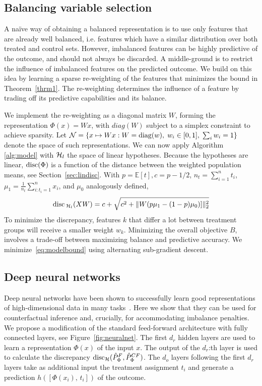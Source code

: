\subsection{Balancing variable selection} \label{sec:varsel}
A na\"{i}ve way of obtaining a balanced representation is to use only features that are already well balanced, i.e. features which have a similar distribution over both treated and control sets. However, imbalanced features can be highly predictive of the outcome, and should not always be discarded. A middle-ground is to restrict the influence of imbalanced features on the predicted outcome. We build on this idea by learning a sparse re-weighting of the features that minimizes the bound in Theorem~\ref{thrm1}. The re-weighting determines the influence of a feature by trading off its predictive capabilities and its balance.

We implement the re-weighting as a diagonal matrix $W$, forming the representation $\Phi(x) = Wx$, with $diag(W)$ subject to a simplex constraint to achieve sparsity. Let $\mathcal{N} = \{x \mapsto Wx : W = \mbox{diag}(w), \; w_i \in [0,1], \; \sum_i w_i = 1\} $ denote the space of such representations. We can now apply Algorithm \ref{alg:model} with $\mathcal{H}_l$ the space of linear hypotheses.
Because the hypotheses are linear, $\operatorname*{disc}(\Phi)$ is a function of the distance between the weighted population means, see Section~\ref{sec:lindisc}. With $p = \mathbb{E}[t], c = p - 1/2$, $n_t = \sum_{i=1}^n t_i$, $\mu_1 = \frac{1}{n_t}\sum_{ i: t_i = 1}^n x_i$, and $\mu_0$ analogously defined,
\begin{align*}
\operatorname*{disc}{}_{\mathcal{H}_l}(XW) = c + \sqrt{c^2 + \|W(p\mu_1 - (1-p)\mu_0)]\|_2^2}
\end{align*}
To minimize the discrepancy, features $k$ that differ a lot between treatment groups will receive a smaller weight $w_k$. Minimizing the overall objective $B$, involves a trade-off between maximizing balance and predictive accuracy. We minimize~\eqref{eq:modelbound} using alternating sub-gradient descent.

\subsection{Deep neural networks}

Deep neural networks have been shown to successfully learn good representations of high-dimensional data in many tasks~\cite{bengio2013representation}. Here we show that they can be used for counterfactual inference and, crucially, for accommodating imbalance penalties.
We propose a modification of the standard feed-forward architecture with fully connected layers, see Figure~\ref{fig:neuralnet}. The first $d_r$ hidden layers are used to learn a representation $\Phi(x)$ of the input $x$. The output of the $d_r$:th layer is used to calculate the discrepancy  $\operatorname*{disc}_{\mathcal{H}}(\hat{P}_\Phi^{F},\hat{P}_\Phi^{CF})$. The $d_o$ layers following the first $d_r$ layers take as additional input the treatment assignment $t_i$ and generate a prediction $h([\Phi(x_i), \, t_i])$  of the outcome.

